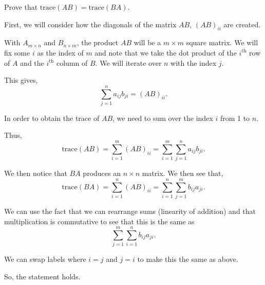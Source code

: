 \documentclass[../hw1]{subfiles}
\begin{document}
  Prove that $\text{trace}(AB)=\text{trace}(BA)$. 

  First, we will consider how the diagonals of the matrix $AB$, $(AB)_{ii}$ are created. 
  
  With $A_{m\times n }$ and $B_{n\times m }$, the product $AB$ will be a $m\times m $ square matrix. We will fix some $i $ as the index of $m$ and note that we take the dot product of the $i ^{\text{th}}$ row of $A $ and the $i ^{\text{th}}$ column of $B$. We will iterate over  $n $ with the index $j $. 

  This gives, \[
    \sum_{j=1 }^{n} a_{ij}b_{ji} = (AB)_{ii} 
  .\] 

  In order to obtain the trace of $AB$, we need to sum over the index $i $ from 1 to $n$. 

  Thus,  \[
    \text{trace}(AB)=\sum_{i=1}^{m}(AB)_{ii}=\sum_{i=1}^{m}\sum_{j=1 }^{n} a_{ij}b_{ji}
  .\] 

  We then notice that $BA$ produces an  $n\times n $ matrix. We then see that, \[
  \text{trace}(BA)=\sum_{i=1}^{n}(AB)_{ii}=\sum_{i=1}^{n}\sum_{j=1 }^{m} b_{ij}a_{ji}
  .\] 

  We can use the fact that we can rearrange sums (linearity of addition) and that multiplication is commutative to see that this is the same as \[
  \sum_{j=1}^{m}\sum_{i=1 }^{n} b_{ij}a_{ji}
  .\] 

  We can swap labels where $i=j$ and  $j=i$ to make this the same as above. 

  So, the statement holds.
\end{document}
